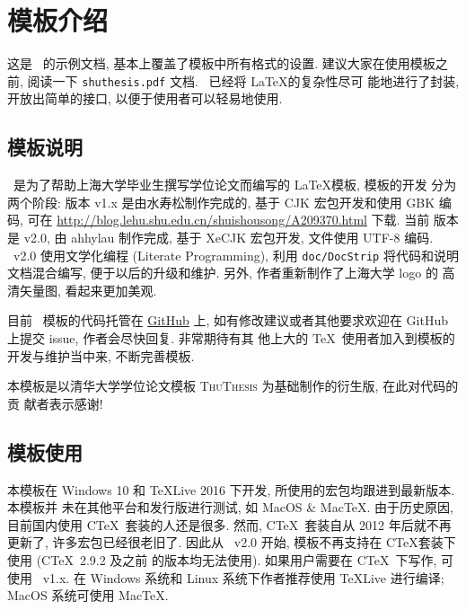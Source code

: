 \chapter{模板介绍}
\label{cha:intro}

这是 \shuthesis\ 的示例文档, 基本上覆盖了模板中所有格式的设置. 建议大家在使用模板之
前, 阅读一下 \texttt{shuthesis.pdf} 文档. \shuthesis\ 已经将 \LaTeX 的复杂性尽可
能地进行了封装, 开放出简单的接口, 以便于使用者可以轻易地使用.
 
\section{模板说明}
\shuthesis\ 是为了帮助上海大学毕业生撰写学位论文而编写的 \LaTeX 模板, 模板的开发
分为两个阶段: 版本 v1.x 是由水寿松制作完成的, 基于 CJK 宏包开发和使用 GBK 编码, 
可在 \url{http://blog.lehu.shu.edu.cn/shuishousong/A209370.html} 下载. 当前
版本是 v2.0, 由 ahhylau 制作完成, 基于 XeCJK 宏包开发, 文件使用 UTF-8 编码. 
\shuthesis\ v2.0 使用文学化编程 (Literate Programming), 利用 \texttt{doc/DocStrip} 
将代码和说明文档混合编写, 便于以后的升级和维护. 另外, 作者重新制作了上海大学 logo 的
高清矢量图, 看起来更加美观. 

目前 \shuthesis\ 模板的代码托管在 \href{https://github.com/ahhylau/shuthesis}{GitHub} 
上, 如有修改建议或者其他要求欢迎在 GitHub 上提交 issue, 作者会尽快回复. 非常期待有其
他上大的 \TeX\ 使用者加入到模板的开发与维护当中来, 不断完善模板.

本模板是以清华大学学位论文模板 \textsc{ThuThesis} 为基础制作的衍生版, 在此对代码的贡
献者表示感谢! 


\section{模板使用}
\label{sec:first}

本模板在 Windows 10 和 \TeX Live 2016 下开发, 所使用的宏包均跟进到最新版本. 本模板并
未在其他平台和发行版进行测试, 如 MacOS \& Mac\TeX. 由于历史原因, 目前国内使用 C\TeX\ 
套装的人还是很多. 然而, C\TeX\ 套装自从 2012 年后就不再更新了, 许多宏包已经很老旧了. 
因此从 \shuthesis\ v2.0 开始, 模板不再支持在 C\TeX 套装下使用 (C\TeX\ 2.9.2 及之前
的版本均无法使用). 如果用户需要在 C\TeX\ 下写作, 可使用 \shuthesis\ v1.x. 在 Windows 
系统和 Linux 系统下作者推荐使用 \TeX Live 进行编译; MacOS 系统可使用 Mac\TeX. 










